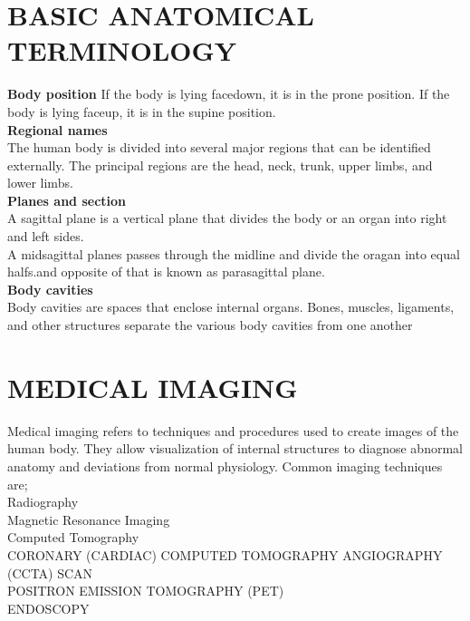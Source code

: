 \documentclass[4pt]{article}
\begin{document}
\section{\huge\textbf{BASIC ANATOMICAL TERMINOLOGY}}
\textbf{Body position}
If the body is lying facedown, it is in the prone position. If the 
body is lying faceup, it is in the supine position.\\
\textbf{Regional names}\\
The human body is divided into several major regions that can be 
identified externally. The principal regions are the head, neck, trunk, 
upper limbs, and lower limbs.\\
\textbf{Planes and section}\\
 A sagittal 
plane  is a vertical plane that divides the body or an organ into right and left sides.\\
A midsagittal planes passes through the midline and divide the oragan into equal halfs.and opposite of that is known as parasagittal plane.\\
\textbf{Body cavities}\\
Body cavities are spaces that enclose internal organs. Bones, muscles, 
ligaments, and other structures separate the various body cavities from 
one another



 
\section{\huge\textbf{MEDICAL IMAGING }}
Medical imaging refers to techniques and procedures used to create images 
of the human body. They allow visualization of internal structures to diagnose 
abnormal anatomy and deviations from normal physiology.
Common imaging techniques are;\\
Radiography\\
Magnetic Resonance Imaging\\
Computed Tomography\\
CORONARY (CARDIAC) COMPUTED TOMOGRAPHY 
ANGIOGRAPHY (CCTA) SCAN\\
POSITRON EMISSION TOMOGRAPHY (PET)\\
ENDOSCOPY\\
\end{document}

